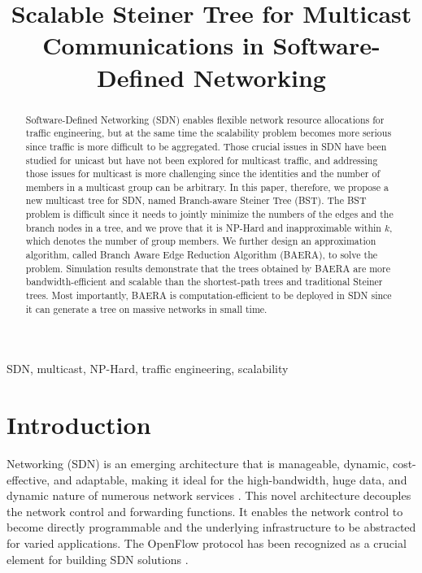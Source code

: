 \documentclass[conference]{IEEEtran}
\begin{document}
\title{Scalable Steiner Tree for Multicast Communications in Software-Defined Networking}



\author{
}

\maketitle

\begin{abstract}
Software-Defined Networking (SDN) enables flexible network resource
allocations for traffic engineering, but at the same time the scalability
problem becomes more serious since traffic is more difficult to be
aggregated. Those crucial issues in SDN have been studied for unicast but have not
been explored for multicast traffic, and addressing those issues for
multicast is more challenging since the identities and the number of
members in a multicast group can be arbitrary. In this paper, therefore, we
propose a new multicast tree for SDN, named Branch-aware Steiner Tree (BST).
The BST problem is difficult since it needs to jointly minimize the numbers of the edges and the branch nodes in a tree, and we prove that it is NP-Hard and
inapproximable within $k$, which denotes the number of group members. We further
design an approximation algorithm, called Branch Aware Edge Reduction
Algorithm (BAERA), to solve the problem. Simulation results demonstrate that
the trees obtained by BAERA are more bandwidth-efficient and scalable than
the shortest-path trees and traditional Steiner trees. Most importantly,
BAERA is computation-efficient to be deployed in SDN since it can generate a
tree on massive networks in small time.
\end{abstract}


\begin{IEEEkeywords}
SDN, multicast, NP-Hard, traffic engineering, scalability
\end{IEEEkeywords}

\section{Introduction}

 Networking (SDN) is an emerging
architecture that is manageable, dynamic, cost-effective, and adaptable,
making it ideal for the high-bandwidth, huge data, and dynamic nature of
numerous network services  \cite{sdnwebsite}. This novel architecture decouples the network
control and forwarding functions. It enables the network control to become
directly programmable and the underlying infrastructure to be abstracted for
varied applications. The OpenFlow protocol has been recognized as a crucial
element for building SDN solutions \cite{sdnwebsite, McKeown2008, OpenFlow2013}.
\end{document}
